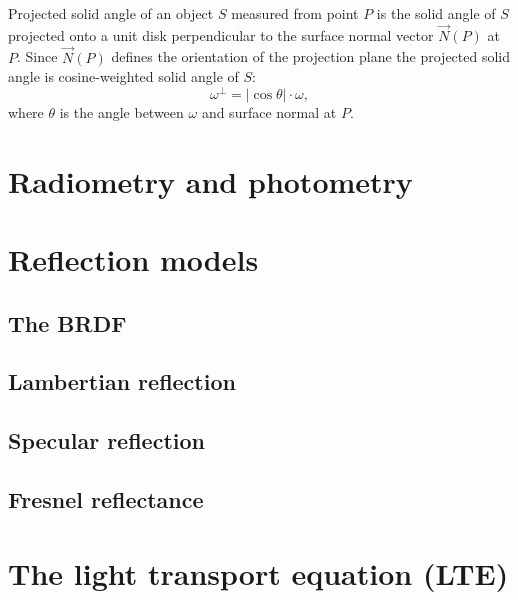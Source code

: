 \begin{df}
Projected solid angle \parencite{nicodemus1976} of an object $S$ measured from point $P$ is the solid angle of $S$ projected onto a unit disk perpendicular to the surface normal vector $\vec{N}(P)$ at $P$. Since $\vec{N}(P)$ defines the orientation of the projection plane the projected solid angle is cosine-weighted solid angle of $S$:
\begin{equation}
  \omega^{\perp} = |\cos\theta| \cdot \omega ,
\end{equation}
where $\theta$ is the angle between $\omega$ and surface normal at $P$.
\end{df}



\section{Radiometry and photometry}

\section{Reflection models}

\subsection{The BRDF}

\subsection{Lambertian reflection}

\subsection{Specular reflection}

\subsection{Fresnel reflectance}

\section{The light transport equation (LTE)}

